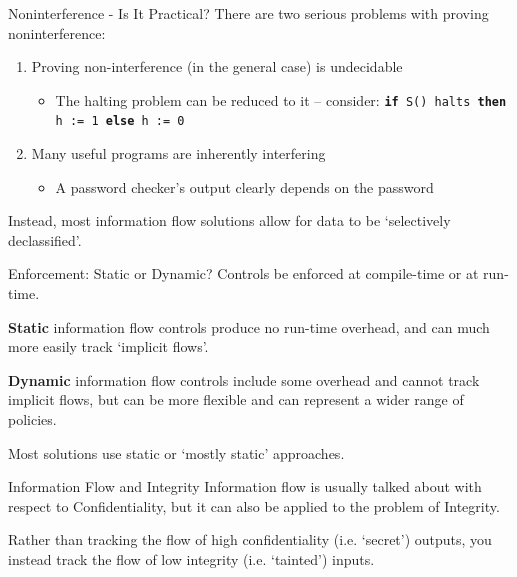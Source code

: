 \begin{frame}{Noninterference - Is It Practical?}
	There are two serious problems with proving noninterference:
	
	\begin{enumerate}
		\item Proving non-interference (in the general case) is undecidable
			\begin{itemize}
				\item The halting problem can be reduced to it -- consider: \newline \texttt{\textbf{if} S() halts \textbf{then} h := 1 \textbf{else} h := 0} \cite{ifbackground:denninghalting}
			\end{itemize}
		\item Many useful programs are inherently interfering
			\begin{itemize}
				\item A password checker's output clearly depends on the password
			\end{itemize}
	\end{enumerate}
	
	Instead, most information flow solutions allow for data to be `selectively declassified'.
\end{frame}

\begin{frame}{Enforcement: Static or Dynamic?}
	Controls be enforced at compile-time or at run-time.
	
	\textbf{Static} information flow controls produce no run-time overhead, and can much more easily track `implicit flows'.
	
	\textbf{Dynamic} information flow controls include some overhead and cannot track implicit flows, but can be more flexible and can represent a wider range of policies.
	
	Most solutions use static or `mostly static' approaches.
\end{frame}

\begin{frame}{Information Flow and Integrity}
	Information flow is usually talked about with respect to Confidentiality, but it can also be applied to the problem of Integrity.
	
	Rather than tracking the flow of high confidentiality (i.e. `secret') outputs, you instead track the flow of low integrity (i.e. `tainted') inputs.
\end{frame}